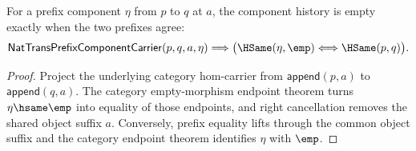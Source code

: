 \begin{theorem}
\label{thm:nattrans-prefix-component-carrier-component-empty-prefix-iff}
For a prefix component $\eta$ from $p$ to $q$ at $a$, the component history is
empty exactly when the two prefixes agree:
$$
\mathsf{NatTransPrefixComponentCarrier}(p,q,a,\eta)
\Longrightarrow
\bigl(\HSame(\eta,\emp)\Longleftrightarrow\HSame(p,q)\bigr).
$$
\end{theorem}
\begin{proof}
Project the underlying category hom-carrier from
$\mathsf{append}(p,a)$ to $\mathsf{append}(q,a)$. The category empty-morphism
endpoint theorem turns $\eta\hsame\emp$ into equality of those endpoints, and
right cancellation removes the shared object suffix $a$. Conversely, prefix
equality lifts through the common object suffix and the category endpoint
theorem identifies $\eta$ with $\emp$.
\end{proof}
